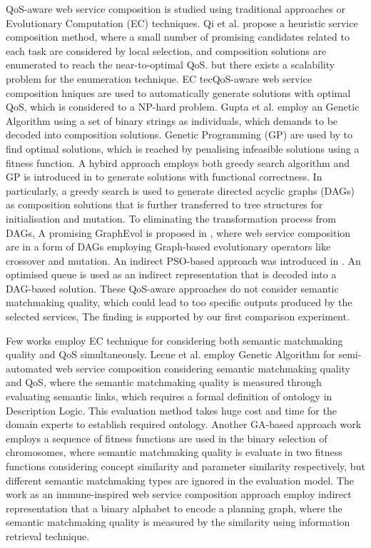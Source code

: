 \documentclass{llncs}
\begin{document}
QoS-aware web service composition is studied using traditional approaches or Evolutionary Computation (EC) techniques. Qi et al. \cite{qi2010combining} propose a heuristic service composition method, where a small number of promising candidates related to each task are considered by local selection, and composition solutions are enumerated to reach the near-to-optimal QoS. but there exists a scalability problem for the enumeration technique. EC tecQoS-aware web service composition \cite{da2016particle,da2015graphevol,yu2013adaptive,ma2015hybrid}hniques are used to automatically generate solutions with optimal QoS, which is considered to a NP-hard problem. Gupta et al. \cite{gupta2015optimization} employ an Genetic Algorithm using a set of binary strings as individuals, which demands to be decoded into composition solutions. Genetic Programming (GP) are used by \cite{yu2013adaptive} to find optimal solutions, which is reached by penalising infeasible solutions using a fitness function. A hybird approach employs both greedy search algorithm and GP is introduced in \cite{ma2015hybrid} to generate solutions with functional correctness. In particularly, a greedy search is used to generate  directed acyclic graphs (DAGs) as composition solutions that is further transferred to tree structures for initialisation and mutation. To eliminating the transformation process from DAGs, A promising GraphEvol is proposed in \cite{da2015graphevol}, where web service composition are in a form of DAGs employing Graph-based evolutionary operators like crossover and mutation. An indirect PSO-based approach was introduced in \cite{da2016particle}. An optimised queue is used as an indirect representation that is decoded into a DAG-based solution. These QoS-aware approaches \cite{gupta2015optimization,qi2010combining,ma2015hybrid,da2016particle,da2015graphevol,yu2013adaptive} do not consider semantic matchmaking quality, which could lead to too specific outputs produced by the selected services, The finding is supported by our first comparison experiment.

Few works \cite{fanjiang2014semantic,lecue2009optimizing,pop2009immune} employ EC technique for considering both semantic matchmaking quality and QoS simultaneously. Lecue et al. \cite{lecue2009optimizing} employ Genetic Algorithm for semi-automated web service composition considering semantic matchmaking quality and QoS, where the semantic matchmaking quality is measured through evaluating semantic links, which requires a formal definition of ontology in Description Logic. This evaluation method takes huge cost and time for the domain experts to establish required ontology. Another GA-based approach work \cite{fanjiang2014semantic} employs a sequence of fitness functions are used in the binary selection of chromosomes, where semantic matchmaking quality is evaluate in two fitness functions considering concept similarity and parameter similarity respectively, but different semantic matchmaking types are ignored in the evaluation model. The work \cite{pop2009immune} as an immune-inspired web service composition approach employ indirect representation that a binary alphabet to encode a planning graph, where the semantic matchmaking quality is measured by the similarity using information retrieval technique.
\end{document}
